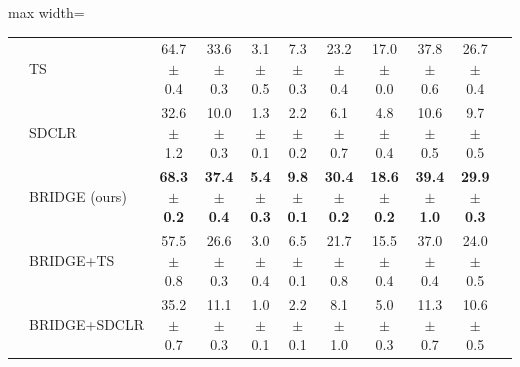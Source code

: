 \begin{table}[t]
\begin{adjustbox}{max width=\textwidth}
\begin{tabular}{l l c c c c c c c c c}
 & TS & 64.7 {\scriptsize$\pm$ 0.4} & 33.6 {\scriptsize$\pm$ 0.3} & 3.1 {\scriptsize$\pm$ 0.5} & 7.3 {\scriptsize$\pm$ 0.3} & 23.2 {\scriptsize$\pm$ 0.4} & 17.0 {\scriptsize$\pm$ 0.0} & 37.8 {\scriptsize$\pm$ 0.6} & 26.7 {\scriptsize$\pm$ 0.4} \\
 & SDCLR & 32.6 {\scriptsize$\pm$ 1.2} & 10.0 {\scriptsize$\pm$ 0.3} & 1.3 {\scriptsize$\pm$ 0.1} & 2.2 {\scriptsize$\pm$ 0.2} & 6.1 {\scriptsize$\pm$ 0.7} & 4.8 {\scriptsize$\pm$ 0.4} & 10.6 {\scriptsize$\pm$ 0.5} & 9.7 {\scriptsize$\pm$ 0.5} \\
 & \rowcolor{blue!10} BRIDGE (ours) & \textbf{68.3 {\scriptsize$\pm$ 0.2}} & \textbf{37.4 {\scriptsize$\pm$ 0.4}} & \textbf{5.4 {\scriptsize$\pm$ 0.3}} & \textbf{9.8 {\scriptsize$\pm$ 0.1}} & \textbf{30.4 {\scriptsize$\pm$ 0.2}} & \textbf{18.6 {\scriptsize$\pm$ 0.2}} & \textbf{39.4 {\scriptsize$\pm$ 1.0}} & \textbf{29.9 {\scriptsize$\pm$ 0.3}} \\
 & BRIDGE+TS & 57.5 {\scriptsize$\pm$ 0.8} & 26.6 {\scriptsize$\pm$ 0.3} & 3.0 {\scriptsize$\pm$ 0.4} & 6.5 {\scriptsize$\pm$ 0.1} & 21.7 {\scriptsize$\pm$ 0.8} & 15.5 {\scriptsize$\pm$ 0.4} & 37.0 {\scriptsize$\pm$ 0.4} & 24.0 {\scriptsize$\pm$ 0.5} \\
 & BRIDGE+SDCLR & 35.2 {\scriptsize$\pm$ 0.7} & 11.1 {\scriptsize$\pm$ 0.3} & 1.0 {\scriptsize$\pm$ 0.1} & 2.2 {\scriptsize$\pm$ 0.1} & 8.1 {\scriptsize$\pm$ 1.0} & 5.0 {\scriptsize$\pm$ 0.3} & 11.3 {\scriptsize$\pm$ 0.7} & 10.6 {\scriptsize$\pm$ 0.5} \\
\bottomrule
\end{tabular}
\end{adjustbox}
\end{table}
